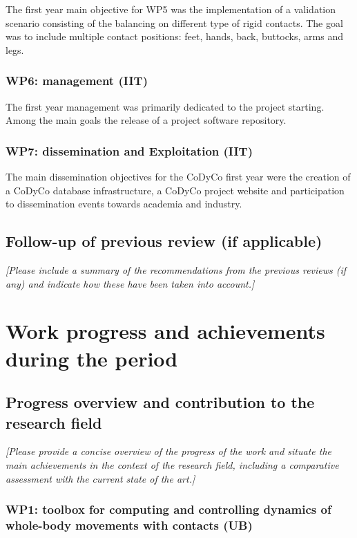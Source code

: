 \documentclass[12pt,a4paper,twoside]{article}
\begin{document}
The first year main objective for WP5 was the implementation of a validation scenario consisting of the balancing on different type of rigid contacts. The goal was to include multiple contact positions: feet, hands, back, buttocks, arms and legs. 


\subsubsection{WP6: management (IIT)}

The first year management was primarily dedicated to the project starting. Among the main goals the release of a project software repository.


\subsubsection{WP7: dissemination and Exploitation (IIT)}

The main dissemination objectives for the CoDyCo first year were the creation of a CoDyCo database infrastructure, a CoDyCo project website and participation to dissemination events towards academia and industry. 

\subsection{Follow-up of previous review (if applicable)}

\emph{\color{red}[Please include a summary of the recommendations from the previous reviews (if any) and indicate how these have been taken into account.]}

\section{Work progress and achievements during the period}

\subsection{Progress overview and contribution to the research field}

\emph{\color{red}[Please provide a concise overview of the progress of the work and situate the main achievements in the context of the research field, including a comparative assessment with the current state of the art.]}

\subsubsection{WP1: toolbox for computing and controlling dynamics of whole-body movements with contacts (UB)}
\end{document}
